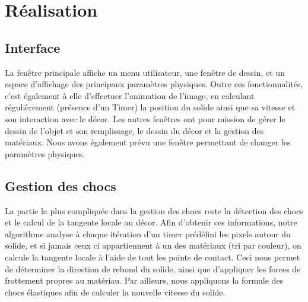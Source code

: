 \section{Réalisation}
\subsection{Interface}
La fenêtre principale affiche un menu utilisateur, une fenêtre de dessin,
et un espace d'affichage des principaux paramètres physiques.
Outre ces fonctionnalités, c'est également à elle d'effectuer l'animation
de l'image, en calculant régulièrement (présence d'un Timer) la position
du solide ainsi que sa vitesse et son interaction avec le décor.
Les autres fenêtres ont pour mission de gérer le dessin de l'objet et son remplissage,
le dessin du décor et la gestion des matériaux.
Nous avons également prévu une fenêtre permettant de changer les paramètres physiques.

\subsection{Gestion des chocs}
La partie la plus compliquée dans la gestion des chocs reste la détection des chocs
et le calcul de la tangente locale au décor. Afin d'obtenir ces informations,
notre algorithme analyse à chaque itération d'un timer prédéfini
les pixels autour du solide, et si jamais ceux ci appartiennent à un des
matériaux (tri par couleur), on calcule la tangente locale à l'aide de
tout les points de contact. Ceci nous permet de déterminer la direction 
de rebond du solide, ainsi que d'appliquer les forces de frottement propres au matériau.
Par ailleurs, nous appliquons la formule des chocs élastiques afin de
calculer la nouvelle vitesse du solide.


